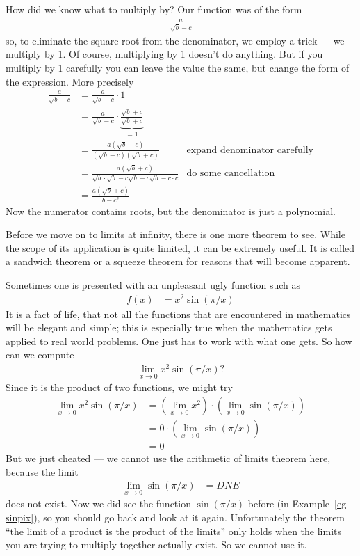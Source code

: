 How did we know what to multiply by? Our function was of the form
\begin{align*}
  \frac{a}{\sqrt{b} - c}
\end{align*}
so, to eliminate the square root from the denominator, we employ a trick --- we multiply
by 1. Of course, multiplying by 1 doesn't do anything. But if you multiply by 1
carefully you can leave the value the same, but change the form of the
expression. More precisely
\begin{align*}
  \frac{a}{\sqrt{b} - c}
  &= \frac{a}{\sqrt{b} - c} \cdot 1 \\
  &= \frac{a}{\sqrt{b} - c} \cdot
\underbrace{\frac{\sqrt{b}+c}{\sqrt{b}+c}}_{=1} \\
  &= \frac{a \left(\sqrt{b}+c \right)}
  {\left(\sqrt{b} - c\right)\left(\sqrt{b}+c \right)}
  & \text{expand denominator carefully} \\
  &= \frac{a \left(\sqrt{b}+c \right)}
  {\sqrt{b} \cdot \sqrt{b} - c\sqrt{b} + c\sqrt{b} - c\cdot c}
  & \text{do some cancellation} \\
  &= \frac{a \left(\sqrt{b}+c \right)} {b - c^2}
\end{align*}
Now the numerator contains roots, but the denominator is just a polynomial.


Before we move on to limits at infinity, there is one more theorem to see.
While the scope of its application is quite limited, it can be extremely
useful. It is called a sandwich theorem or a squeeze theorem for reasons that
will become apparent.

Sometimes one is presented with an unpleasant ugly function such as
\begin{align*}
  f(x) &= x^2 \sin(\pi/x)
\end{align*}
It is a fact of life, that not all the functions that are encountered in
mathematics will be elegant and simple; this is especially true when the
mathematics gets applied to real world problems. One just has to work with what one gets.
So how can we compute
\begin{align*}
  \lim_{x \to 0} x^2 \sin(\pi/x) ?
\end{align*}
Since it is the product of two functions, we might try
\begin{align*}
  \lim_{x \to 0} x^2 \sin(\pi/x)
  &=
  \left( \lim_{x \to 0} x^2 \right) \cdot \left( \lim_{x \to 0} \sin(\pi/x)
\right)\\
  &= 0 \cdot \left( \lim_{x \to 0} \sin(\pi/x)  \right)\\
  & = 0
\end{align*}
But we just cheated --- we cannot use the arithmetic of limits theorem here, because the
limit
\begin{align*}
  \lim_{x \to 0} \sin(\pi/x) &= DNE
\end{align*}
does not exist. Now we did see the function $\sin(\pi/x)$ before (in
Example~\ref{eg sinpix}), so you should go back and look at it again.
Unfortunately the theorem ``the limit of a product is the product of the
limits'' only holds when the limits you are trying to multiply together actually
exist. So we cannot use it.

